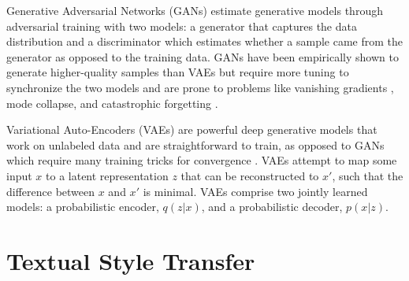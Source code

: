 Generative Adversarial Networks (GANs) \citep{goodfellow2020generative} estimate generative models through adversarial training with two models: a generator that captures the data distribution and a discriminator which estimates whether a sample came from the generator as opposed to the training data. GANs have been empirically shown to generate higher-quality samples than VAEs \citep{bond2021deep} but require more tuning to synchronize the two models and are prone to problems like vanishing gradients \citep{arjovsky2017towards}, mode collapse, and catastrophic forgetting \citep{thanh2020catastrophic}.

Variational Auto-Encoders (VAEs) \citep{kingma2013auto} are powerful deep generative models that work on unlabeled data and are straightforward to train, as opposed to GANs which require many training tricks for convergence \citep{bond2021deep}. VAEs attempt to map some input $x$ to a latent representation $z$ that can be reconstructed to $x'$, such that the difference between $x$ and $x'$ is minimal. VAEs comprise two jointly learned models: a probabilistic encoder, $q(z|x)$, and a probabilistic decoder, $p(x|z)$.



\section{Textual Style Transfer}
\label{rel:tst}

